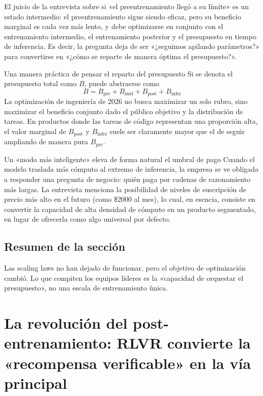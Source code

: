 \documentclass[a4paper]{article}
\begin{document}
El juicio de la entrevista sobre si «el preentrenamiento llegó a su límite» es un estado intermedio: el preentrenamiento sigue siendo eficaz, pero su beneficio marginal es cada vez más lento, y debe optimizarse en conjunto con el entrenamiento intermedio, el entrenamiento posterior y el presupuesto en tiempo de inferencia. Es decir, la pregunta deja de ser «¿seguimos apilando parámetros?» para convertirse en «¿cómo se reparte de manera óptima el presupuesto?».

\begin{knowledgebox}{Una manera práctica de pensar el reparto del presupuesto}
Si se denota el presupuesto total como $B$, puede abstraerse como
\[
B = B_{\text{pre}} + B_{\text{mid}} + B_{\text{post}} + B_{\text{infer}}
\]
La optimización de ingeniería de 2026 no busca maximizar un solo rubro, sino maximizar el beneficio conjunto dado el público objetivo y la distribución de tareas. En productos donde las tareas de código representan una proporción alta, el valor marginal de $B_{\text{post}}$ y $B_{\text{infer}}$ suele ser claramente mayor que el de seguir ampliando de manera pura $B_{\text{pre}}$.
\end{knowledgebox}

\begin{warningbox}{Un «modo más inteligente» eleva de forma natural el umbral de pago}
Cuando el modelo traslada más cómputo al extremo de inferencia, la empresa se ve obligada a responder una pregunta de negocio: quién paga por cadenas de razonamiento más largas. La entrevista menciona la posibilidad de niveles de suscripción de precio más alto en el futuro (como \$2000 al mes), lo cual, en esencia, consiste en convertir la capacidad de alta densidad de cómputo en un producto segmentado, en lugar de ofrecerla como algo universal por defecto.
\end{warningbox}

\subsection{Resumen de la sección}

Las scaling laws no han dejado de funcionar, pero el objetivo de optimización cambió. Lo que compiten los equipos líderes es la «capacidad de orquestar el presupuesto», no una escala de entrenamiento única.

\section{La revolución del post-entrenamiento: RLVR convierte la «recompensa verificable» en la vía principal}
\end{document}
